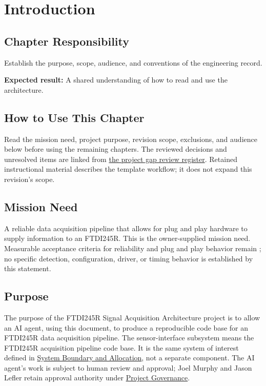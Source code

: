 \chapter{Introduction}

\section{Chapter Responsibility}
\label{Section:IntroductionResponsibility}
Establish the purpose, scope, audience, and conventions of the engineering record.

\noindent\textbf{Expected result:} A shared understanding of how to read and use the architecture.

\section{How to Use This Chapter}
Read the mission need, project purpose, revision scope, exclusions, and
audience below before using the
remaining chapters. The reviewed decisions and unresolved items are linked
from \hyperref[Table:ProjectGapReview]{the project gap review register}.
Retained instructional material describes the template workflow; it does not
expand this revision's scope.

\section{Mission Need}
\label{Section:ProjectMissionNeed}
A reliable data acquisition pipeline that allows for plug and play hardware to supply information to an FTDI245R.
This is the owner-supplied mission need. Measurable acceptance criteria for
reliability and plug and play behavior remain \OwnedTBD{}; no specific detection,
configuration, driver, or timing behavior is established by this statement.

\section{Purpose}
\label{Section:ProjectPurpose}
The purpose of the FTDI245R Signal Acquisition Architecture project is to allow an AI agent, using this document, to produce a reproducible code base for an FTDI245R data acquisition pipeline.
The sensor-interface subsystem means the FTDI245R acquisition pipeline code
base. It is the same system of interest defined in
\hyperref[Section:ProjectSystemBoundary]{System Boundary and Allocation},
not a separate component. The AI agent's work is subject to human review
and approval; Joel Murphy and Jason Lefler retain approval authority under
\hyperref[Section:ProjectGovernance]{Project Governance}.

